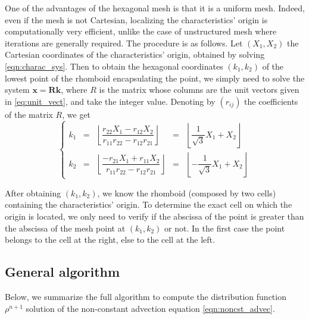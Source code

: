 \documentclass[proc]{edpsmath}
\newcommand{\blue}[1]{\textcolor{blue}{#1}}
\begin{document}
One of the advantages of the hexagonal mesh is that it is a uniform mesh. Indeed, even if the mesh is not Cartesian, localizing the characteristics' origin is computationally  very efficient, unlike the case of unstructured mesh where iterations are generally required. The procedure is as follows. Let $(X_1, X_2)$ the Cartesian coordinates of the characteristics' origin, obtained by solving \eqref{eqn:charac_sys}. Then to obtain the hexagonal coordinates $(k_1, k_2)$ of the lowest point of the rhomboid encapsulating the point, we simply need to solve the system $\mathbf{x} = \mathbf{R} \mathbf{k}$, where $R$ is the matrix whose columns are the unit vectors given in \eqref{eq:unit_vect}, and take the integer value.  Denoting by $(r_{ij})$ the coefficients of the matrix $R$, we get
\begin{equation}
	\label{eqn:k1k2}
	\left\lbrace
	\begin{array}{lclcl}
	k_1 &=&  \left\lfloor\dfrac{ r_{22} X_1 - r_{12} X_2 }{r_{11} r_{22} - r_{12} r_{21}}\right\rfloor & = &  \left\lfloor\dfrac{1}{\sqrt{3}} X_1 + X_2\right\rfloor\\[0.3cm]
	k_2 &=&  \left\lfloor\dfrac{ - r_{21} X_1+r_{11} X_2}{r_{11} r_{22} - r_{12} r_{21}} \right\rfloor& = &\left \lfloor -\dfrac{1}{\sqrt{3}} X_1 + X_2\right\rfloor
	\end{array}\right.
\end{equation}

After obtaining $(k_1, k_2)$, we know the rhomboid (composed by two cells) containing the characteristics' origin. To determine the exact cell on which the origin is located, we only need to verify if the abscissa of the point is greater than the abscissa of the mesh point at $(k_1, k_2)$ or not. In the first case the point belongs to the cell at the right, else to the cell at the left.


\subsection{General algorithm}

Below, we summarize the full algorithm to compute the distribution function $\rho^{n+1}$ solution of the non-constant advection equation \eqref{eqn:noncst_advec}.
\end{document}

